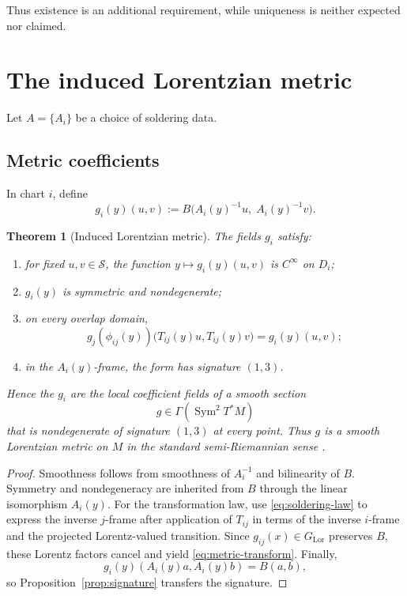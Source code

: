 \documentclass[11pt,a4paper]{article}
\newtheorem{theorem}{Theorem}[section]
\theoremstyle{definition}
\theoremstyle{remark}
\newcommand{\Smodel}{\mathcal{S}}
\newcommand{\LorG}{G_{\mathrm{Lor}}}
\begin{document}
Thus existence is an additional requirement, while uniqueness is neither
expected nor claimed.

\clearpage
\section{The induced Lorentzian metric}
\label{sec:metric}

Let \(A=\{A_i\}\) be a choice of soldering data.

\subsection{Metric coefficients}

In chart \(i\), define
\[
   g_i(y)(u,v)
   :=
   B\bigl(A_i(y)^{-1}u,\;A_i(y)^{-1}v\bigr).
\tag{8.1}\label{eq:metric-coeff}
\]

\begin{theorem}[Induced Lorentzian metric]
\label{thm:smooth-metric}
The fields \(g_i\) satisfy:
\begin{enumerate}
\item for fixed \(u,v\in\Smodel\), the function
      \(y\mapsto g_i(y)(u,v)\) is \(C^\infty\) on \(D_i\);
\item \(g_i(y)\) is symmetric and nondegenerate;
\item on every overlap domain,
\[
  g_j(\phi_{ij}(y))
     \bigl(T_{ij}(y)u,T_{ij}(y)v\bigr)
  =
  g_i(y)(u,v);
\tag{8.2}\label{eq:metric-transform}
\]
\item in the \(A_i(y)\)-frame, the form has signature \((1,3)\).
\end{enumerate}
Hence the \(g_i\) are the local coefficient fields of a smooth section
\[
   g\in\Gamma(\operatorname{Sym}^{2}T^{*}M)
\]
that is nondegenerate of signature \((1,3)\) at every point.  Thus \(g\) is a smooth
Lorentzian metric on \(M\) in the standard semi-Riemannian sense
\cite{ONeill,Nakahara}.
\end{theorem}

\begin{proof}
Smoothness follows from smoothness of \(A_i^{-1}\) and bilinearity of
\(B\).  Symmetry and nondegeneracy are inherited from \(B\) through the
linear isomorphism \(A_i(y)\).  For the transformation law, use
\eqref{eq:soldering-law} to express the inverse \(j\)-frame after application of
\(T_{ij}\) in terms of the inverse \(i\)-frame and the projected Lorentz-valued transition.  Since \(g_{ij}(x)\in\LorG\) preserves \(B\), these
Lorentz factors cancel and yield \eqref{eq:metric-transform}.  Finally,
\[
   g_i(y)(A_i(y)a,A_i(y)b)=B(a,b),
\]
so Proposition~\ref{prop:signature} transfers the signature.
\end{proof}
\end{document}
